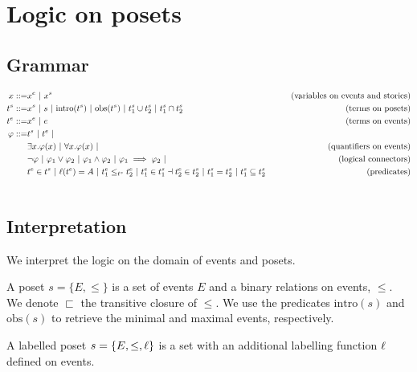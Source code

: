 \section{Logic on posets}

\subsection{Grammar}

\begin{align*}
  x ::= & x^e ~|~ x^s & \tag{variables on events and stories} \\
  t^s ::= & x^s ~|~ s ~|~ \text{intro}(t^s) ~|~ \text{obs}(t^s) ~|~ t^s_1 \cup t^s_2 ~|~ t^s_1 \cap t^s_2 &\tag{terms on posets} \\
  t^e ::= & x^e ~|~ e & \tag{terms on events}
  \\
  \varphi ::= & t^s ~|~ t^e ~| \\
  & \exists x.\varphi(x) ~|~ \forall x.\varphi(x) ~|&\tag{quantifiers on events}\\
  & \neg \varphi ~|~ \varphi_1 \vee \varphi_2~|~\varphi_1 \wedge \varphi_2~|~\varphi_1 \implies \varphi_2~|&\tag{logical connectors}\\
  & t^e\in t^s ~|~ \ell(t^e) = A ~|~ t^e_1 \leq_{t^s} t^e_2 ~|~ t^e_1\in t^s_1 \dashv t^e_2\in t^s_2~|~ t^s_1 = t^s_2 ~|~ t^s_1\subseteq t^s_2
  & \tag{predicates}\\
  \\
\end{align*}

\subsection{Interpretation}

We interpret the logic on the domain of events and posets.

\begin{definition}[Poset]
  \label{def:poset}
  A poset $s=\{E,\leq\}$ is a set of events $E$ and a binary relations on events, $\leq$. We denote $\sqsubset$ the transitive closure of $\leq$.
  We use the predicates $\text{intro}(s)$ and $\text{obs}(s)$ to retrieve the minimal and maximal events, respectively.

  A labelled poset $s=\{E,\leq,\ell\}$ is a set with an additional labelling function $\ell$ defined on events.
\end{definition}

